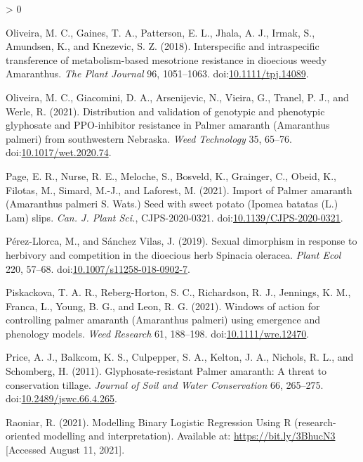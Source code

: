 \documentclass[utf8]{frontiersSCNS}
\newlength{\cslhangindent}
\newenvironment{CSLReferences}[2] %
 {%
  \setlength{\parindent}{0pt}
  \ifodd #1 \everypar{\setlength{\hangindent}{\cslhangindent}}\ignorespaces\fi
  \ifnum #2 > 0
  \setlength{\parskip}{#2\baselineskip}
  \fi
 }%
 {}
\begin{document}
\begin{CSLReferences}{1}{0}
\leavevmode\hypertarget{ref-oliveira2018}{}%
Oliveira, M. C., Gaines, T. A., Patterson, E. L., Jhala, A. J., Irmak,
S., Amundsen, K., and Knezevic, S. Z. (2018). Interspecific and
intraspecific transference of metabolism-based mesotrione resistance in
dioecious weedy {Amaranthus}. \emph{The Plant Journal} 96, 1051--1063.
doi:\href{https://doi.org/10.1111/tpj.14089}{10.1111/tpj.14089}.

\leavevmode\hypertarget{ref-oliveira2021a}{}%
Oliveira, M. C., Giacomini, D. A., Arsenijevic, N., Vieira, G., Tranel,
P. J., and Werle, R. (2021). Distribution and validation of genotypic
and phenotypic glyphosate and {PPO}-inhibitor resistance in {Palmer}
amaranth ({Amaranthus} palmeri) from southwestern {Nebraska}. \emph{Weed
Technology} 35, 65--76.
doi:\href{https://doi.org/10.1017/wet.2020.74}{10.1017/wet.2020.74}.

\leavevmode\hypertarget{ref-page2021}{}%
Page, E. R., Nurse, R. E., Meloche, S., Bosveld, K., Grainger, C.,
Obeid, K., Filotas, M., Simard, M.-J., and Laforest, M. (2021). Import
of {Palmer} amaranth ({Amaranthus} palmeri {S}. {Wats}.) Seed with sweet
potato ({Ipomea} batatas ({L}.) {Lam}) slips. \emph{Can. J. Plant Sci.},
CJPS-2020-0321.
doi:\href{https://doi.org/10.1139/CJPS-2020-0321}{10.1139/CJPS-2020-0321}.

\leavevmode\hypertarget{ref-perez-llorca2019}{}%
Pérez-Llorca, M., and Sánchez Vilas, J. (2019). Sexual dimorphism in
response to herbivory and competition in the dioecious herb {Spinacia}
oleracea. \emph{Plant Ecol} 220, 57--68.
doi:\href{https://doi.org/10.1007/s11258-018-0902-7}{10.1007/s11258-018-0902-7}.

\leavevmode\hypertarget{ref-piskackova2021}{}%
Piskackova, T. A. R., Reberg-Horton, S. C., Richardson, R. J., Jennings,
K. M., Franca, L., Young, B. G., and Leon, R. G. (2021). Windows of
action for controlling palmer amaranth ({Amaranthus} palmeri) using
emergence and phenology models. \emph{Weed Research} 61, 188--198.
doi:\href{https://doi.org/10.1111/wre.12470}{10.1111/wre.12470}.

\leavevmode\hypertarget{ref-price2011}{}%
Price, A. J., Balkcom, K. S., Culpepper, S. A., Kelton, J. A., Nichols,
R. L., and Schomberg, H. (2011). Glyphosate-resistant {Palmer} amaranth:
{A} threat to conservation tillage. \emph{Journal of Soil and Water
Conservation} 66, 265--275.
doi:\href{https://doi.org/10.2489/jswc.66.4.265}{10.2489/jswc.66.4.265}.

\leavevmode\hypertarget{ref-raoniar2021}{}%
Raoniar, R. (2021). Modelling {Binary Logistic Regression Using R}
(research-oriented modelling and interpretation). Available at:
\url{https://bit.ly/3BhucN3} {[}Accessed August 11, 2021{]}.


\end{CSLReferences}
\end{document}
